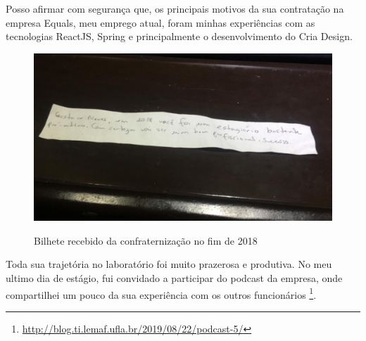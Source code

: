 Posso afirmar com segurança que, os principais motivos da sua contratação na empresa Equals, meu emprego atual, foram minhas experiências com as tecnologias ReactJS, Spring e principalmente o desenvolvimento do Cria Design.

\begin{figure}[H]
\centering
\caption{Bilhete recebido da confraternização no fim de 2018} %

\includegraphics[scale=0.3]{agradecimento}\\  %
\label{fig:exemplo} %
\end{figure}

Toda sua trajetória no laboratório foi muito prazerosa e produtiva. No meu ultimo dia de estágio, fui convidado a participar do podcast da empresa, onde compartilhei um pouco da sua experiência com os outros funcionários \footnote{\url{http://blog.ti.lemaf.ufla.br/2019/08/22/podcast-5/}}.
